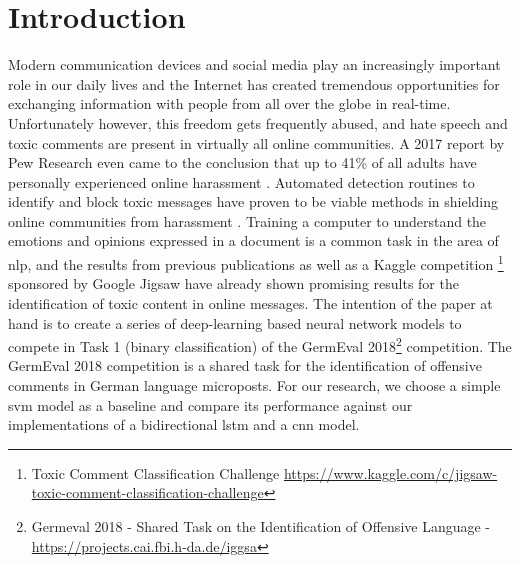 \documentclass[11pt]{article}
\begin{document}
\section{Introduction}
Modern communication devices and social media play an increasingly important role in our daily lives and the Internet has created tremendous opportunities for exchanging information with people from all over the globe in real-time. Unfortunately however, this freedom gets frequently abused, and hate speech and toxic comments are present in virtually all online communities. A 2017 report by Pew Research even came to the conclusion that up to 41\% of all adults have personally experienced online harassment \cite{RN63}.
\newline
Automated detection routines to identify and block toxic messages have proven to be viable methods in shielding online communities from harassment \cite{RN27}. Training a computer to understand the emotions and opinions expressed in a document is a common task in the area of \ac{nlp}, and the results from previous publications  \cite{RN14} as well as a Kaggle competition \footnote{Toxic Comment Classification Challenge \url{https://www.kaggle.com/c/jigsaw-toxic-comment-classification-challenge}} sponsored by Google Jigsaw have already shown promising results for the identification of toxic content in online messages.
\newline
The intention of the paper at hand is to create a series of deep-learning based neural network models to compete in Task 1 (binary classification) of the GermEval 2018\footnote{\label{footnote:germ2018}Germeval 2018 - Shared Task on the Identification of Offensive Language - \url{https://projects.cai.fbi.h-da.de/iggsa}} competition. The GermEval 2018 competition is a shared task for the identification of offensive comments in German language microposts. For our research, we choose a simple \ac{svm} model as a baseline and compare its performance against our implementations of a bidirectional \ac{lstm} and a \ac{cnn} model. 
\end{document}

